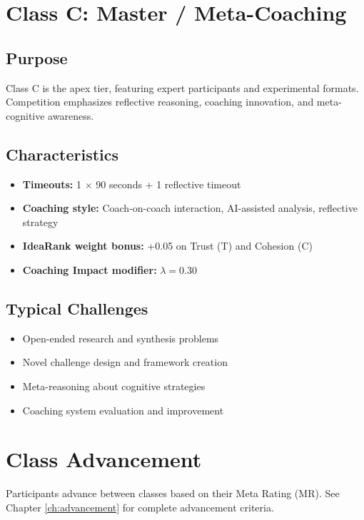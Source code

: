 \section{Class C: Master / Meta-Coaching}

\subsection{Purpose}
Class C is the apex tier, featuring expert participants and experimental formats. Competition emphasizes reflective reasoning, coaching innovation, and meta-cognitive awareness.

\subsection{Characteristics}
\begin{itemize}[leftmargin=*]
  \item \textbf{Timeouts:} 1 $\times$ 90 seconds + 1 reflective timeout
  \item \textbf{Coaching style:} Coach-on-coach interaction, AI-assisted analysis, reflective strategy
  \item \textbf{IdeaRank weight bonus:} +0.05 on Trust (T) and Cohesion (C)
  \item \textbf{Coaching Impact modifier:} $\lambda = 0.30$
\end{itemize}

\subsection{Typical Challenges}
\begin{itemize}[leftmargin=*]
  \item Open-ended research and synthesis problems
  \item Novel challenge design and framework creation
  \item Meta-reasoning about cognitive strategies
  \item Coaching system evaluation and improvement
\end{itemize}

\section{Class Advancement}

Participants advance between classes based on their Meta Rating (MR). See Chapter \ref{ch:advancement} for complete advancement criteria.

